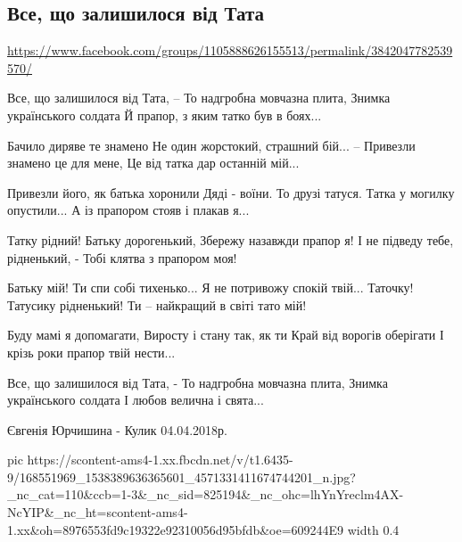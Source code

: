  
 
 
 
 

\subsection{Все, що залишилося від Тата}
\url{https://www.facebook.com/groups/1105888626155513/permalink/3842047782539570/}

Все, що залишилося від Тата, --
То надгробна мовчазна плита,
Знимка українського солдата
Й прапор, з яким татко був в боях...

Бачило диряве те знамено
Не один жорстокий, страшний бій...
-- Привезли знамено це для мене,
Це від татка дар останній мій...

Привезли його, як батька хоронили
Дяді - воїни. То друзі татуся.
Татка у могилку опустили...
А із прапором стояв і плакав я...

Татку рідний! Батьку дорогенький,
Збережу назавжди прапор я!
І не підведу тебе, рідненький, -
Тобі клятва з прапором моя!

Батьку мій! Ти спи собі тихенько...
Я не потривожу спокій твій...
Таточку! Татусику рідненький!
Ти -- найкращий в світі тато мій!

Буду мамі я допомагати,
Виросту і стану так, як ти
Край від ворогів оберігати
І крізь роки прапор твій нести...

Все, що залишилося від Тата, -
То надгробна мовчазна плита,
Знимка українського солдата
І любов велична і свята...

Євгенія Юрчишина - Кулик
04.04.2018р.


\ifcmt
  pic https://scontent-ams4-1.xx.fbcdn.net/v/t1.6435-9/168551969_1538389636365601_4571331411674744201_n.jpg?_nc_cat=110&ccb=1-3&_nc_sid=825194&_nc_ohc=lhYnYreclm4AX-NcYIP&_nc_ht=scontent-ams4-1.xx&oh=8976553fd9c19322e92310056d95bfdb&oe=609244E9
  width 0.4
\fi

